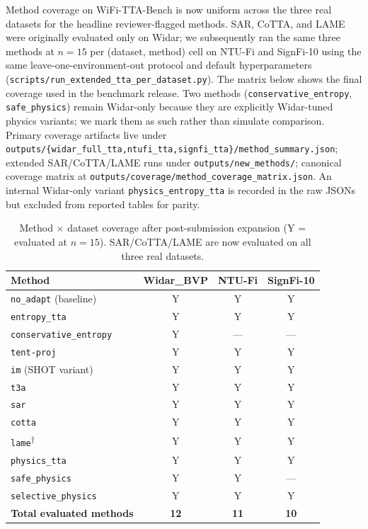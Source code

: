 Method coverage on WiFi-TTA-Bench is now uniform across the three real datasets for the headline reviewer-flagged methods. SAR, CoTTA, and LAME were originally evaluated only on Widar; we subsequently ran the same three methods at $n{=}15$ per (dataset, method) cell on NTU-Fi and SignFi-10 using the same leave-one-environment-out protocol and default hyperparameters (\texttt{scripts/run\_extended\_tta\_per\_dataset.py}). The matrix below shows the final coverage used in the benchmark release. Two methods (\texttt{conservative\_entropy}, \texttt{safe\_physics}) remain Widar-only because they are explicitly Widar-tuned physics variants; we mark them as such rather than simulate comparison. Primary coverage artifacts live under \texttt{outputs/\{widar\_full\_tta,ntufi\_tta,signfi\_tta\}/method\_summary.json}; extended SAR\slash CoTTA\slash LAME runs under \texttt{outputs/new\_methods/}; canonical coverage matrix at \texttt{outputs/coverage/method\_coverage\_matrix.json}. An internal Widar-only variant \texttt{physics\_entropy\_tta} is recorded in the raw JSONs but excluded from reported tables for parity.

\begin{table}[h]
\centering
\caption{Method $\times$ dataset coverage after post-submission expansion (Y = evaluated at $n{=}15$). SAR/CoTTA/LAME are now evaluated on all three real datasets.}
\label{tab:coverage}
\small
\setlength{\tabcolsep}{5pt}
\begin{tabular}{lccc}
\toprule
\textbf{Method} & \textbf{Widar\_BVP} & \textbf{NTU-Fi} & \textbf{SignFi-10} \\
\midrule
\texttt{no\_adapt} (baseline)     & Y & Y & Y \\
\texttt{entropy\_tta}             & Y & Y & Y \\
\texttt{conservative\_entropy}    & Y & --- & --- \\
\texttt{tent-proj}                & Y & Y & Y \\
\texttt{im} (SHOT variant)        & Y & Y & Y \\
\texttt{t3a}                      & Y & Y & Y \\
\texttt{sar}                      & Y & Y & Y \\
\texttt{cotta}                    & Y & Y & Y \\
\texttt{lame}\textsuperscript{$\dagger$} & Y & Y & Y \\
\texttt{physics\_tta}             & Y & Y & Y \\
\texttt{safe\_physics}            & Y & Y & --- \\
\texttt{selective\_physics}       & Y & Y & Y \\
\midrule
\textbf{Total evaluated methods}  & \textbf{12} & \textbf{11} & \textbf{10} \\
\bottomrule
\end{tabular}
\end{table}

